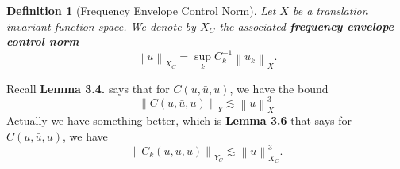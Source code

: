 \documentclass{article}
\newtheorem{definition}{Definition}
\newcommand\norm[1]{\left\lVert#1\right\rVert}
\begin{document}
\begin{definition}[Frequency Envelope Control Norm]
  \label{def:frequency-envelope-control-norm}
  Let $X$ be a translation invariant function space. We denote by $X_{C}$ the
  associated \textbf{frequency envelope control norm}
  \begin{equation*}
    \norm{u}_{X_{C}} = \sup_{k}C_{k}^{-1} \norm{u_{k}}_{X}.
  \end{equation*}
\end{definition}
Recall \textbf{Lemma 3.4.} says that for $C(u,\bar{u},u)$, we have the bound
\begin{equation}\label{eq:lemma3.4-inequality}
  \norm{C(u,\bar{u},u)}_{Y} \lesssim \norm{u}_{X}^{3}
\end{equation}  
Actually we have something better, which is \textbf{Lemma 3.6} that says for
$C(u,\bar{u},u)$, we have
\begin{equation*}
  \norm{C_{k}(u,\bar{u},u)}_{Y_{C}} \lesssim \norm{u}_{X_{C}}^{3}.
\end{equation*}
\end{document}
